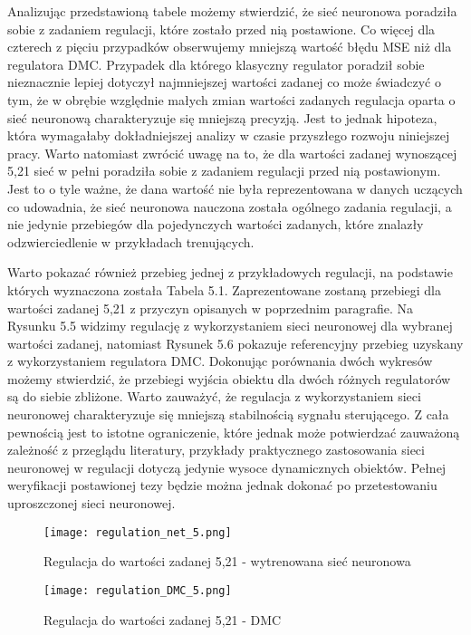 Analizując przedstawioną tabele możemy stwierdzić, że sieć neuronowa poradziła sobie z zadaniem regulacji, które zostało przed nią postawione. Co więcej dla czterech z pięciu przypadków obserwujemy mniejszą wartość błędu MSE niż dla regulatora DMC. Przypadek dla którego klasyczny regulator poradził sobie nieznacznie lepiej dotyczył najmniejszej wartości zadanej co może świadczyć o tym, że w obrębie względnie małych zmian wartości zadanych regulacja oparta o sieć neuronową charakteryzuje się mniejszą precyzją. Jest to jednak hipoteza, która wymagałaby dokładniejszej analizy w czasie przyszłego rozwoju niniejszej pracy. Warto natomiast zwrócić uwagę na to, że dla wartości zadanej wynoszącej 5,21 sieć w pełni poradziła sobie z zadaniem regulacji przed nią postawionym. Jest to o tyle ważne, że dana wartość nie była reprezentowana w danych uczących co udowadnia, że sieć neuronowa nauczona została ogólnego zadania regulacji, a nie jedynie przebiegów dla pojedynczych wartości zadanych, które znalazły odzwierciedlenie w przykładach trenujących. 

\par Warto pokazać również przebieg jednej z przykładowych regulacji, na podstawie których wyznaczona została Tabela 5.1. Zaprezentowane zostaną przebiegi dla wartości zadanej 5,21 z przyczyn opisanych w poprzednim paragrafie. Na Rysunku 5.5 widzimy regulację z wykorzystaniem sieci neuronowej dla wybranej wartości zadanej, natomiast Rysunek 5.6 pokazuje referencyjny przebieg uzyskany z wykorzystaniem regulatora DMC. Dokonując porównania dwóch wykresów możemy stwierdzić, że przebiegi wyjścia obiektu dla dwóch różnych regulatorów są do siebie zbliżone. Warto zauważyć, że regulacja z wykorzystaniem sieci neuronowej charakteryzuje się mniejszą stabilnością sygnału sterującego. Z cała pewnością jest to istotne ograniczenie, które jednak może potwierdzać zauważoną zależność z przeglądu literatury, przykłady praktycznego zastosowania sieci neuronowej w regulacji dotyczą jedynie wysoce dynamicznych obiektów. Pełnej weryfikacji postawionej tezy będzie można jednak dokonać po przetestowaniu uproszczonej sieci neuronowej.

\begin{figure}[h]
  \label{fig:sim-net-5}
  \centering \texttt{[image: regulation\_net\_5.png]}
  \caption{Regulacja do wartości zadanej 5,21 - wytrenowana sieć neuronowa}
\end{figure}

\begin{figure}[h]
  \label{fig:sim-dmc-5}
  \centering \texttt{[image: regulation\_DMC\_5.png]}
  \caption{Regulacja do wartości zadanej 5,21 - DMC}
\end{figure}

